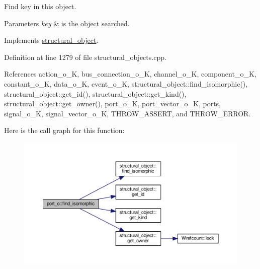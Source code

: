 Find key in this object. 


\begin{DoxyParams}{Parameters}
{\em key} & is the object searched. \\
\hline
\end{DoxyParams}


Implements \hyperlink{classstructural__object_a87756f7dab3d9a866c81b96b88e11380}{structural\+\_\+object}.



Definition at line 1279 of file structural\+\_\+objects.\+cpp.



References action\+\_\+o\+\_\+K, bus\+\_\+connection\+\_\+o\+\_\+K, channel\+\_\+o\+\_\+K, component\+\_\+o\+\_\+K, constant\+\_\+o\+\_\+K, data\+\_\+o\+\_\+K, event\+\_\+o\+\_\+K, structural\+\_\+object\+::find\+\_\+isomorphic(), structural\+\_\+object\+::get\+\_\+id(), structural\+\_\+object\+::get\+\_\+kind(), structural\+\_\+object\+::get\+\_\+owner(), port\+\_\+o\+\_\+K, port\+\_\+vector\+\_\+o\+\_\+K, ports, signal\+\_\+o\+\_\+K, signal\+\_\+vector\+\_\+o\+\_\+K, T\+H\+R\+O\+W\+\_\+\+A\+S\+S\+E\+RT, and T\+H\+R\+O\+W\+\_\+\+E\+R\+R\+OR.

Here is the call graph for this function\+:
\nopagebreak
\begin{figure}[H]
\begin{center}
\leavevmode
\includegraphics[width=350pt]{df/d75/structport__o_a2ece93b5f3aaa09fdadbb373f3f9d31a_cgraph}
\end{center}
\end{figure}
\mbox{\label{structport__o_a4a8b1daac79a77d3196a10e8a297a2ce}} 
